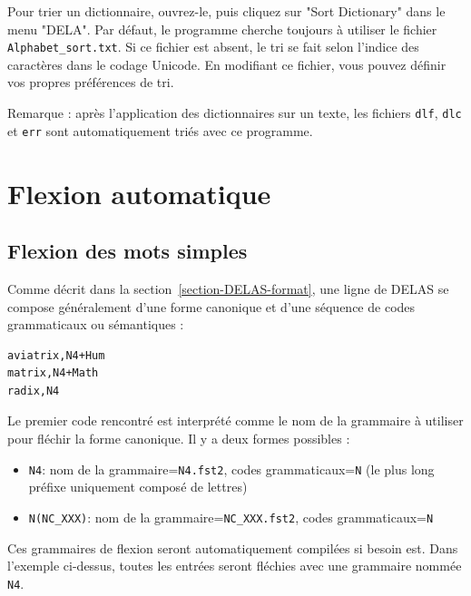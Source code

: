 \bigskip
\noindent Pour trier un dictionnaire, ouvrez-le, puis cliquez sur "Sort Dictionary" dans le menu
"DELA". Par défaut, le programme cherche toujours à utiliser le fichier \verb+Alphabet_sort.txt+.
Si ce fichier est absent, le tri se fait selon l’indice des caractères dans le codage Unicode.
En modifiant ce fichier, vous pouvez définir vos propres préférences de tri.


\bigskip
\noindent Remarque : après l’application des dictionnaires sur un texte, les fichiers
\verb+dlf+, \verb+dlc+ et \verb+err+ sont automatiquement triés avec ce programme.
 



\section{Flexion automatique}
\label{section-automatic-inflection}
\subsection{Flexion des mots simples}

Comme décrit dans la section~\ref{section-DELAS-format}, une ligne de DELAS se compose généralement
d’une forme canonique et d’une séquence de codes grammaticaux ou sémantiques :


\begin{verbatim}
aviatrix,N4+Hum
matrix,N4+Math
radix,N4
\end{verbatim}

\bigskip
\noindent Le premier code rencontré est interprété comme le nom de la grammaire à utiliser pour
fléchir la forme canonique. Il y a deux formes possibles :

\begin{itemize}
\item \verb+N4+: nom de la grammaire=\verb+N4.fst2+, codes grammaticaux=\verb+N+
	(le plus long préfixe uniquement composé de lettres)
  \item \verb+N(NC_XXX)+: nom de la grammaire=\verb+NC_XXX.fst2+, codes grammaticaux=\verb+N+
\end{itemize}

\bigskip
\noindent Ces grammaires de flexion seront automatiquement compilées si
besoin est. Dans l’exemple ci-dessus, toutes les entrées seront fléchies avec une grammaire nommée
\verb+N4+.

